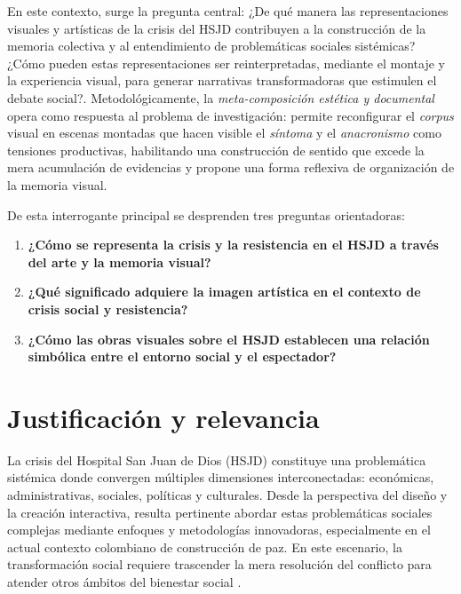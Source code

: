 En este contexto, surge la pregunta central: ¿De qué manera las representaciones visuales y artísticas de la crisis del HSJD contribuyen a la construcción de la memoria colectiva y al entendimiento de problemáticas sociales sistémicas? ¿Cómo pueden estas representaciones ser reinterpretadas, mediante el montaje y la experiencia visual, para generar narrativas transformadoras que estimulen el debate social?. \textcolor{edit30sept}{Metodológicamente, la \textit{meta-composición estética y documental} opera como respuesta al problema de investigación: permite reconfigurar el \textit{corpus} visual en escenas montadas que hacen visible el \textit{síntoma} y el \textit{anacronismo} como tensiones productivas, habilitando una construcción de sentido que excede la mera acumulación de evidencias y propone una forma reflexiva de organización de la memoria visual.}

De esta interrogante principal se desprenden tres preguntas orientadoras:

\begin{enumerate}
    \item \textbf{¿Cómo se representa la crisis y la resistencia en el HSJD a través del arte y la memoria visual?}

    \item \textbf{¿Qué significado adquiere la imagen artística en el contexto de crisis social y resistencia?}

    \item \textbf{¿Cómo las obras visuales sobre el HSJD establecen una relación simbólica entre el entorno social y el espectador?}
\end{enumerate}

\section*{Justificación y relevancia}

La crisis del Hospital San Juan de Dios (HSJD) constituye una problemática sistémica donde convergen múltiples dimensiones interconectadas: económicas, administrativas, sociales, políticas y culturales. Desde la perspectiva del diseño y la creación interactiva, resulta pertinente abordar estas problemáticas sociales complejas mediante enfoques y metodologías innovadoras, especialmente en el actual contexto colombiano de construcción de paz. En este escenario, la transformación social requiere trascender la mera resolución del conflicto para atender otros ámbitos del bienestar social \parencite[p. 313]{Capra1998}.


